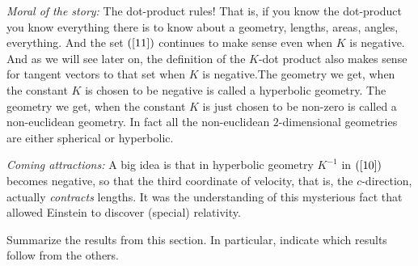 \documentclass{ximera}
\begin{document}
\textit{Moral of the story:} The dot-product rules! That is, if you
know the dot-product you know everything there is to know about a
geometry, lengths, areas, angles, everything. And the set $\left(
\ref{11}\right) $ continues to make sense even when $K$ is
negative. And as we will see later on, the definition of the $K$-dot
product also makes sense for tangent vectors to that set when $K$ is
negative.The geometry we get, when the constant $K$ is chosen to be
negative is called a hyperbolic geometry. The geometry we get, when
the constant $K$ is just chosen to be non-zero is called a
non-euclidean geometry.  In fact all the non-euclidean $2$-dimensional
geometries are either spherical or hyperbolic.

\textit{Coming attractions:} A big idea is that in hyperbolic geometry
$K^{-1}$ in $\left( \ref{10}\right) $ becomes negative, so that the
third coordinate of velocity, that is, the $c$-direction, actually
\textit{contracts} lengths. It was the understanding of this
mysterious fact that allowed Einstein to discover (special)
relativity.


\begin{problem}
Summarize the results from this section. In particular, indicate which
results follow from the others.
\begin{freeResponse}
\end{freeResponse}
\end{problem}
\end{document}
